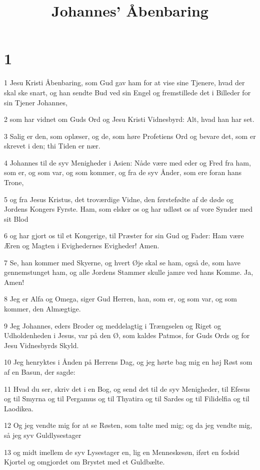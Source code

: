 

\title{Johannes' Åbenbaring}


\chapter{1}

\par 1 Jesu Kristi Åbenbaring, som Gud gav ham for at vise sine Tjenere, hvad der skal ske snart, og han sendte Bud ved sin Engel og fremstillede det i Billeder for sin Tjener Johannes,
\par 2 som har vidnet om Guds Ord og Jesu Kristi Vidnesbyrd: Alt, hvad han har set.
\par 3 Salig er den, som oplæser, og de, som høre Profetiens Ord og bevare det, som er skrevet i den; thi Tiden er nær.
\par 4 Johannes til de syv Menigheder i Asien: Nåde være med eder og Fred fra ham, som er, og som var, og som kommer, og fra de syv Ånder, som ere foran hans Trone,
\par 5 og fra Jesus Kristus, det troværdige Vidne, den førstefødte af de døde og Jordens Kongers Fyrste. Ham, som elsker os og har udløst os af vore Synder med sit Blod
\par 6 og har gjort os til et Kongerige, til Præster for sin Gud og Fader: Ham være Æren og Magten i Evighedernes Evigheder! Amen.
\par 7 Se, han kommer med Skyerne, og hvert Øje skal se ham, også de, som have gennemstunget ham, og alle Jordens Stammer skulle jamre ved hans Komme. Ja, Amen!
\par 8 Jeg er Alfa og Omega, siger Gud Herren, han, som er, og som var, og som kommer, den Almægtige.
\par 9 Jeg Johannes, eders Broder og meddelagtig i Trængselen og Riget og Udholdenheden i Jesus, var på den Ø, som kaldes Patmos, for Guds Ords og for Jesu Vidnesbyrds Skyld.
\par 10 Jeg henryktes i Ånden på Herrens Dag, og jeg hørte bag mig en høj Røst som af en Basun, der sagde:
\par 11 Hvad du ser, skriv det i en Bog, og send det til de syv Menigheder, til Efesus og til Smyrna og til Pergamus og til Thyatira og til Sardes og til Filidelfia og til Laodikea.
\par 12 Og jeg vendte mig for at se Røsten, som talte med mig; og da jeg vendte mig, så jeg syv Guldlysestager
\par 13 og midt imellem de syv Lysestager en, lig en Menneskesøn, iført en fodsid Kjortel og omgjordet om Brystet med et Guldbælte.
